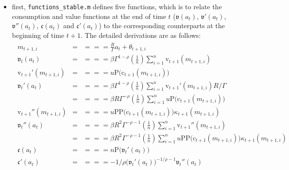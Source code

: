 \documentclass[titlepage,abstract]{\econtex}
\begin{document}
\begin{itemize}
     \item first, \texttt{functions\_stable.m} defines five functions, which is to relate the consumption and value functions at the end of time $t$ ($\ensuremath{\mathfrak{v}}(a_{t})$, $\ensuremath{\mathfrak{v}}'(a_{t})$,
            $\ensuremath{\mathfrak{v}}''(a_{t})$, $\ensuremath{\mathfrak{c}}(a_{t})$ and $\ensuremath{\mathfrak{c}}'(a_{t})$) to the corresponding counterparts at the beginning of time $t+1$. The detailed derivations are as follows:
            \begin{equation}\begin{gathered}\begin{aligned}
            m_{t+1, i}    &=& =  =  =  \frac{R}{\Gamma} {a}_{t} + \theta_{t+1, i} \\
            \ensuremath{\mathfrak{v}}_{t}(a_{t})    & = &  =  =  = \beta \Gamma^{1-\rho} \left(\frac{1}{n}\right)\sum_{i=1}^{n} \ensuremath{\mathrm{v}}_{t+1}(m_{t+1, i}) \\
            \ensuremath{\mathrm{v}}_{t+1}'(m_{t+1, i})    &=& =  =  =  u\text{P}(\ensuremath{\mathrm{c}}_{t+1}(m_{t+1, i})\big) \\
            \ensuremath{\mathfrak{v}}_{t}'(a_{t})    & = &  =  =  = \beta \Gamma^{1-\rho} \left(\frac{1}{n}\right)\sum_{i=1}^{n} \ensuremath{\mathrm{v}}_{t+1}'(m_{t+1, i}) R/\Gamma\\
               &=& =  =  =  \beta R \Gamma^{-\rho} \left(\frac{1}{n}\right)\sum_{i=1}^{n}
            u\text{P}(\ensuremath{\mathrm{c}}_{t+1}(m_{t+1, i})\big) \\
            \ensuremath{\mathrm{v}}_{t+1}''(m_{t+1, i})    &=& =  =  =  u\text{PP}\big(\ensuremath{\mathrm{c}}_{t+1}(m_{t+1, i})\big) \kappa_{t+1}(m_{t+1, i}) \\
            \ensuremath{\mathfrak{v}}_{t}''(a_{t})    & = &  =  =  = \beta R^{2} \Gamma^{-\rho-1} \left(\frac{1}{n}\right)\sum_{i=1}^{n} \ensuremath{\mathrm{v}}_{t+1}''(m_{t+1, i}) \\
               &=& =  =  =  \beta R^{2} \Gamma^{-\rho-1} \left(\frac{1}{n}\right)\sum_{i=1}^{n}
              u\text{PP}\big(\ensuremath{\mathrm{c}}_{t+1}(m_{t+1, i})\big) \ensuremath{\kappa}_{t+1}(m_{t+1, i}) \\
              \ensuremath{\mathfrak{c}}(a_{t})    &=& =  =  =  n\text{P}\big(\ensuremath{\mathfrak{v}}_{t}'(a_{t})\big) \\
              \ensuremath{\mathfrak{c}}'(a_{t})    &=& =  =  = -1/\rho \big(\ensuremath{\mathfrak{v}}_{t}'(a_{t})\big)^{-1/\rho-1} \ensuremath{\mathfrak{v}}_{t}''(a_{t}) \\

\end{aligned}
\end{gathered}
\end{equation}
\end{itemize}
\end{document}
